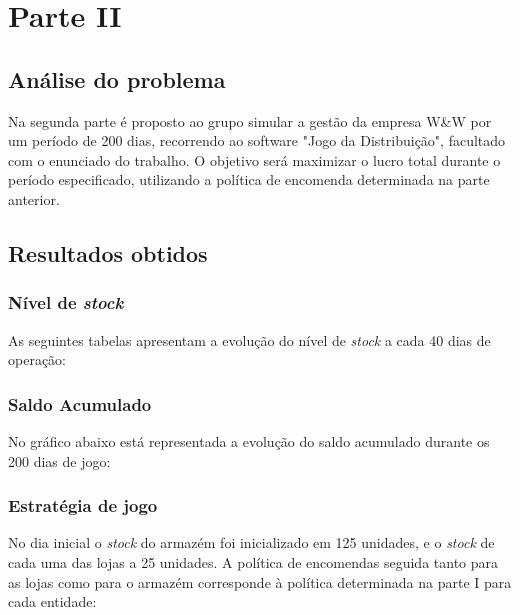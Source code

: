 \chapter{Parte II}

\section{Análise do problema}

Na segunda parte é proposto ao grupo simular a gestão da empresa W\&W por um
período de 200 dias, recorrendo ao software "Jogo da Distribuição", facultado
com o enunciado do trabalho. O objetivo será maximizar o lucro total durante
o período especificado, utilizando a política de encomenda determinada na parte
anterior.

\section{Resultados obtidos}

\subsection{Nível de \emph{stock}}

As seguintes tabelas apresentam a evolução do nível de \emph{stock} a cada 40 dias de operação: 










\subsection{Saldo Acumulado}

No gráfico abaixo está representada a evolução do saldo acumulado durante os 200
dias de jogo:



\newpage

\subsection{Estratégia de jogo}

No dia inicial o \emph{stock} do armazém foi inicializado em 125 unidades,
e o \emph{stock} de cada uma das lojas a 25 unidades. A política de encomendas
seguida tanto para as lojas como para o armazém corresponde à política
determinada na parte I para cada entidade:

